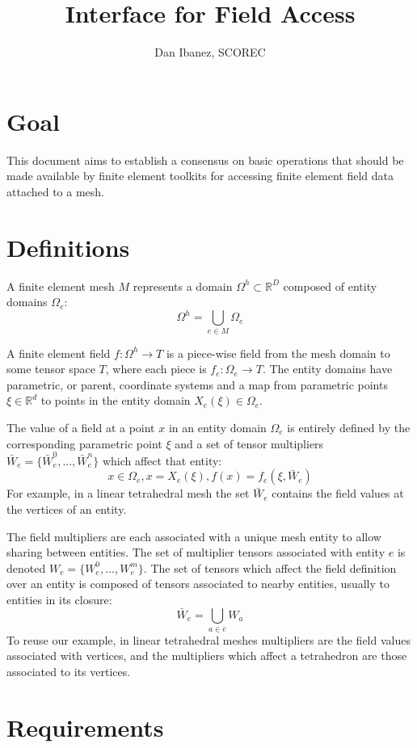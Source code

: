 \documentclass{article}
\title{Interface for Field Access}
\author{Dan Ibanez, SCOREC}
\begin{document}
\maketitle

\section{Goal}

This document aims to establish a consensus on
basic operations that should be made available
by finite element toolkits for accessing finite
element field data attached to a mesh.

\section{Definitions}

A finite element mesh $M$ represents a domain
$\Omega^h \subset {\mathbb R^D}$
composed of entity domains $\Omega_e$:
\[\Omega^h = \bigcup_{e\in M} \Omega_e\]

A finite element field $f : \Omega^h \to T$ is a piece-wise field
from the mesh domain to some tensor space $T$, where
each piece is $f_e : \Omega_e \to T$.
The entity domains have parametric, or parent, coordinate
systems and a map from parametric points $\xi \in {\mathbb R^d}$
to points in the entity domain $X_e(\xi) \in \Omega_e$.

The value of a field at a point $x$ in an entity domain $\Omega_e$
is entirely defined by the corresponding parametric point $\xi$
and a set of tensor multipliers $\bar{W}_e = \{\bar{W}_e^0,...,\bar{W}_e^n\}$
which affect that entity:
\[x\in \Omega_e, x = X_e(\xi), f(x) = f_e(\xi,\bar{W}_e)\]
For example, in a linear tetrahedral mesh the set $\bar{W}_e$ contains
the field values at the vertices of an entity.

The field multipliers are each associated with a unique mesh entity
to allow sharing between entities.
The set of multiplier tensors associated with entity $e$ is denoted
$W_e = \{W_e^0,...,W_e^m\}$.
The set of tensors which affect the field definition over an entity
is composed of tensors associated to nearby entities, usually to
entities in its closure:
\[\bar{W}_e = \bigcup_{a \in \bar{e}} W_a\]
To reuse our example, in linear tetrahedral meshes multipliers are
the field values associated with vertices, and the multipliers
which affect a tetrahedron are those associated to its vertices.

\section{Requirements}
\end{document}
